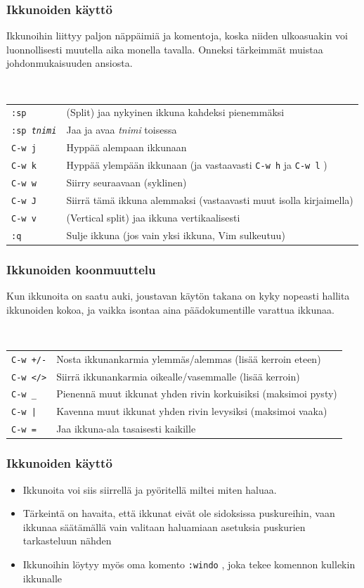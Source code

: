 \documentclass[]{beamer}
\newcommand{\Tohj}[1]{\texttt{#1}}
\newcommand{\com}[1]{{\color{blue!50!black}\Tohj{#1}} \!\!}
\begin{document}
\begin{frame}
    \frametitle{Ikkunoiden käyttö}
    Ikkunoihin liittyy paljon näppäimiä ja komentoja, koska niiden ulkoasuakin voi luonnollisesti muutella aika monella tavalla. Onneksi tärkeimmät muistaa johdonmukaisuuden ansiosta.

    \ \\
    \begin{tabular}{ll}
    \com{:sp} & (Split) jaa nykyinen ikkuna kahdeksi pienemmäksi \\
    \com{:sp \emph{tnimi}} & Jaa ja avaa \emph{tnimi} toisessa \\
    \com{C-w j} & Hyppää alempaan ikkunaan \\
    \com{C-w k} & Hyppää ylempään ikkunaan (ja vastaavasti \com{C-w h} ja \com{C-w l}) \\
    \com{C-w w} & Siirry seuraavaan (syklinen) \\
    \com{C-w J} & Siirrä tämä ikkuna alemmaksi (vastaavasti muut isolla kirjaimella) \\
    \com{C-w v} & (Vertical split) jaa ikkuna vertikaalisesti \\
    \com{:q} & Sulje ikkuna (jos vain yksi ikkuna, Vim sulkeutuu)\\
    \end{tabular}
\end{frame}

\begin{frame}
    \frametitle{Ikkunoiden koonmuuttelu}
    Kun ikkunoita on saatu auki, joustavan käytön takana on kyky nopeasti hallita ikkunoiden kokoa, ja vaikka isontaa aina päädokumentille varattua ikkunaa.

    \ \\
    \begin{tabular}{ll}
    \com{C-w +/-} & Nosta ikkunankarmia ylemmäs/alemmas (lisää kerroin eteen) \\
    \com{C-w </>} & Siirrä ikkunankarmia oikealle/vasemmalle (lisää kerroin)\\
    \com{C-w \_} & Pienennä muut ikkunat yhden rivin korkuisiksi (maksimoi pysty)\\
    \com{C-w |} & Kavenna muut ikkunat yhden rivin levysiksi (maksimoi vaaka)\\
    \com{C-w =} & Jaa ikkuna-ala tasaisesti kaikille\\
    \end{tabular}
\end{frame}

\begin{frame}
    \frametitle{Ikkunoiden käyttö}
    \begin{itemize}
        \item Ikkunoita voi siis siirrellä ja pyöritellä miltei miten haluaa.
        \item Tärkeintä on havaita, että ikkunat eivät ole sidoksissa puskureihin, vaan ikkunaa säätämällä vain valitaan haluamiaan asetuksia puskurien tarkasteluun nähden
        \pause
        \item Ikkunoihin löytyy myös oma komento \com{:windo}, joka tekee komennon kullekin ikkunalle
    \end{itemize}
\end{frame}
\end{document}
